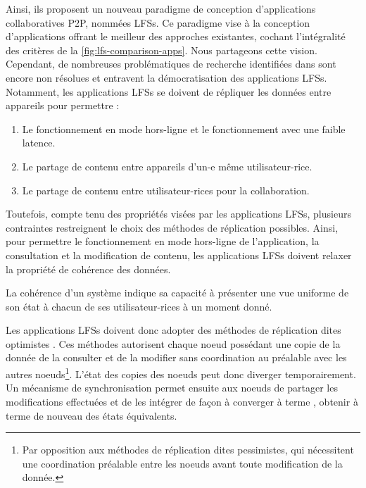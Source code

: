 Ainsi, ils proposent un nouveau paradigme de conception d'applications collaboratives \ac{P2P}, nommées \acp{LFS}.
Ce paradigme vise à la conception d'applications offrant le meilleur des approches existantes, \ie cochant l'intégralité des critères de la \autoref{fig:lfs-comparison-apps}.
Nous partageons cette vision.\\

Cependant, de nombreuses problématiques de recherche identifiées dans \cite{localfirstsoftware2019} sont encore non résolues et entravent la démocratisation des applications \acp{LFS}.
Notamment, les applications \acp{LFS} se doivent de répliquer les données entre appareils pour permettre :
\begin{enumerate}
  \item Le fonctionnement en mode hors-ligne et le fonctionnement avec une faible latence.
  \item Le partage de contenu entre appareils d'un-e même utilisateur-rice.
  \item Le partage de contenu entre utilisateur-rices pour la collaboration.
\end{enumerate}

Toutefois, compte tenu des propriétés visées par les applications \acp{LFS}, plusieurs contraintes restreignent le choix des méthodes de réplication possibles.
Ainsi, pour permettre le fonctionnement en mode hors-ligne de l'application, \ie la consultation et la modification de contenu, les applications \acp{LFS} doivent relaxer la propriété de cohérence des données.
\begin{definition}[Cohérence]
  La cohérence d'un système indique sa capacité à présenter une vue uniforme de son état à chacun de ses utilisateur-rices à un moment donné.
\end{definition}

Les applications \acp{LFS} doivent donc adopter des méthodes de réplication dites optimistes \cite{2005-optimistic-replication-saito}.
Ces méthodes autorisent chaque noeud possédant une copie de la donnée de la consulter et de la modifier sans coordination au préalable avec les autres noeuds\footnote{Par opposition aux méthodes de réplication dites pessimistes, qui nécessitent une coordination préalable entre les noeuds avant toute modification de la donnée.}.
L'état des copies des noeuds peut donc diverger temporairement.
Un mécanisme de synchronisation permet ensuite aux noeuds de partager les modifications effectuées et de les intégrer de façon à converger à terme \cite{10.1145/224057.224070}, \ie obtenir à terme de nouveau des états équivalents.

